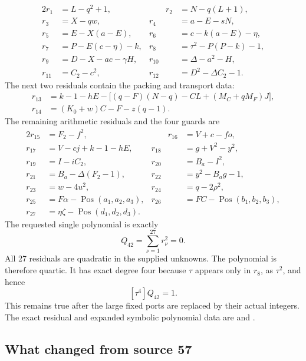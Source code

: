 \documentclass[11pt,a4paper]{article}
\theoremstyle{remark}\newtheorem{remark}[theorem]{Remark}
\newcommand{\Pos}{\operatorname{Pos}}
\begin{document}
\begin{alignat}{2}
 r_1&=L-q^2+1,&\qquad r_2&=N-q(L+1),\nonumber\\
 r_3&=X-qw,&r_4&=a-E-sN,\nonumber\\
 r_5&=E-X(a-E),&r_6&=c-k(a-E)-\eta,\nonumber\\
 r_7&=P-E(c-\eta)-k,&r_8&=\tau^2-P(P-k)-1,\nonumber\\
 r_9&=D-X-ac-\gamma H,&r_{10}&=\Delta-a^2-H,\nonumber\\
 r_{11}&=C_2-c^2,&r_{12}&=D^2-\Delta C_2-1.
 \label{eq:quartic-first}
\end{alignat}
The next two residuals contain the packing and transport data:
\begin{align}
 r_{13}&=k-1-hE-\bigl[(q-F)(N-q)-CL+(M_C+qM_F)J\bigr],\nonumber\\
 r_{14}&=(K_0+w)C-F-z(q-1).
 \label{eq:quartic-packing}
\end{align}
The remaining arithmetic residuals and the four guards are
\begin{alignat}{2}
 r_{15}&=F_2-f^2,&\qquad r_{16}&=V+c-fo,\nonumber\\
 r_{17}&=V-cj+k-1-hE,&r_{18}&=g+V^2-y^2,\nonumber\\
 r_{19}&=I-iC_2,&r_{20}&=B_a-I^2,\nonumber\\
 r_{21}&=B_a-\Delta(F_2-1),&r_{22}&=y^2-B_ag-1,\nonumber\\
 r_{23}&=w-4u^2,&r_{24}&=q-2\rho^2,\nonumber\\
 r_{25}&=F\alpha-\Pos(a_1,a_2,a_3),&
 r_{26}&=FC-\Pos(b_1,b_2,b_3),\nonumber\\
 r_{27}&=\eta\zeta-\Pos(d_1,d_2,d_3).&&
 \label{eq:quartic-last}
\end{alignat}
The requested single polynomial is exactly
\begin{equation}
 \boxed{\displaystyle Q_{42}=\sum_{\nu=1}^{27}r_\nu^2=0.}
 \label{eq:quartic}
\end{equation}
All 27 residuals are quadratic in the supplied unknowns. The polynomial
is therefore quartic. It has exact degree four because $\tau$ appears
only in $r_8$, as $\tau^2$, and hence
\[
 [\tau^4]Q_{42}=1.
\]
This remains true after the large fixed ports are replaced by their actual
integers. The exact residual and expanded symbolic polynomial data are
 and
.

\subsection{What changed from source 57}
\end{document}
